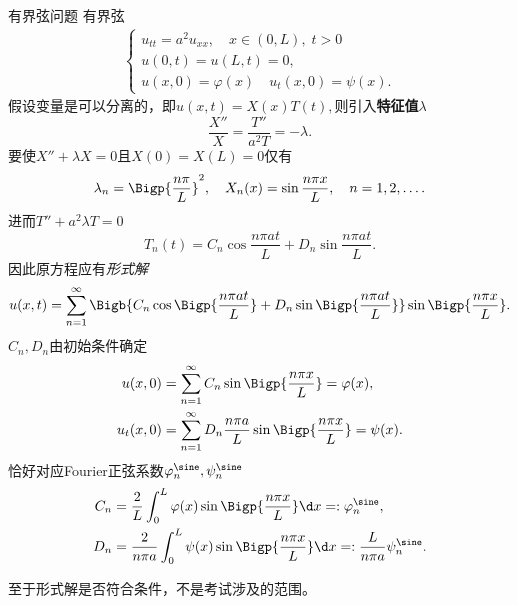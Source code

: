 \begin{example}{有界弦问题}{}
	有界弦
	\begin{align*}
		\begin{cases}
			u_{tt}=a^2u_{xx},\quad x\in(0,L),\;t>0 \\
			u(0,t)=u(L,t)=0,                 \\
			u(x,0)=\varphi(x)\quad u_t(x,0)=\psi(x).
		\end{cases}
	\end{align*}
	假设变量是可以分离的，即$u(x,t)=X(x)T(t),$则引入\textbf{特征值}$\lambda$
	\[
		\frac{X''}X=\frac{T''}{a^2T}=-\lambda.
	\]
	要使$X''+\lambda X=0$且$X(0)=X(L)=0$仅有
	\[
		\lambda_n=\Bigp{\frac{n\pi}L}^2,\quad X_n(x)=\sin\frac{n\pi x}L,\quad n=1,2,\ldots.
	\]
	进而$T''+a^2\lambda T=0$
	\[
		T_n(t)=C_n\cos\frac{n\pi at}L+D_n\sin\frac{n\pi at}L.
	\]
	因此原方程应有\textit{形式解}
	\begin{align}
		u(x,t)=\sum_{n=1}^\infty\Bigb{C_n\cos\Bigp{\frac{n\pi at}L}+D_n\sin\Bigp{\frac{n\pi at}L}}\sin\Bigp{\frac{n\pi x}L}.
	\end{align}
	$C_n,D_n$由初始条件确定
	\begin{align*}
		u(x,0)&=\sum_{n=1}^\infty C_n\sin\Bigp{\frac{n\pi x}L}=\varphi(x),            \\
		u_t(x,0)&=\sum_{n=1}^\infty D_n\frac{n\pi a}L\sin\Bigp{\frac{n\pi x}L}=\psi(x).
	\end{align*}
	恰好对应Fourier正弦系数$\varphi^{\sine}_n,\psi^{\sine}_n$
	\begin{align*}
		C_n & =\frac2L\int_0^L\varphi(x)\sin\Bigp{\frac{n\pi x}L}\d x=:\varphi_n^{\sine},                  \\
		D_n & =\frac2{n\pi a}\int_0^L\psi(x)\sin\Bigp{\frac{n\pi x}L}\d x=:\frac{L}{n\pi a}\psi_n^{\sine}.
	\end{align*}
	
	至于形式解是否符合条件，不是考试涉及的范围。
\end{example}
